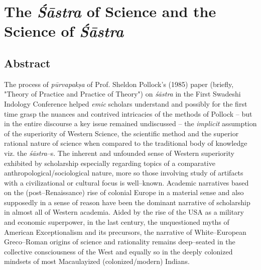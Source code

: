 
\chapter{The \textit{Śāstra} of Science and the Science of \textit{Śāstra}}\label{chapter6}


\vskip 2pt

\section*{Abstract}

\vskip 2pt

The process of \textit{pūrvapakṣa} of Prof. Sheldon Pollock’s (1985) paper (briefly, "Theory of Practice and Practice of Theory") on \textit{śāstra} in the First Swadeshi Indology Conference helped \textit{emic} scholars understand and possibly for the first time grasp the nuances and contrived intricacies of the methods of Pollock – but in the entire discourse a key issue remained undiscussed – the \textit{implicit} assumption of the superiority of Western Science, the scientific method and the superior rational nature of science when compared to the traditional body of knowledge viz. the \textit{śāstra}–s. The inherent and unfounded sense of Western superiority exhibited by scholarship especially regarding topics of a comparative anthropological/sociological nature, more so those involving study of artifacts with a civilizational or cultural focus is well–known. Academic narratives based on the (post–Renaissance) rise of colonial Europe in a material sense and also supposedly in a sense of reason have been the dominant narrative of scholarship in almost all of Western academia. Aided by the rise of the USA as a military and economic superpower, in the last century, the unquestioned myths of American Exceptionalism and its precursors, the narrative of White–European Greco–Roman origins of science and rationality remains deep–seated in the collective consciousness of the West and equally so in the deeply colonized mindsets of most Macaulayized (colonized/modern) Indians.

